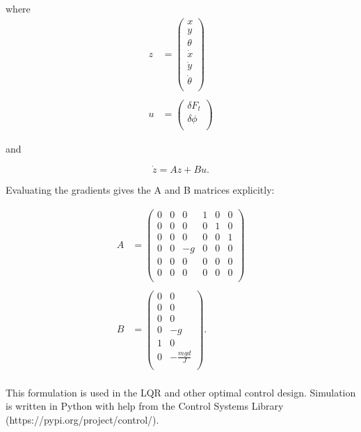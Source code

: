 \documentclass[12pt]{article}
\begin{document}
where 
\begin{align*}
z &= \begin{pmatrix}
x \\
y \\
\theta \\
\dot{x} \\
\dot{y} \\
\dot{\theta} \\
\end{pmatrix} \\ \\
u &= \begin{pmatrix}
\delta F_t \\
\delta\phi \\
\end{pmatrix}
\end{align*}

and

\begin{equation*}
\dot{z} = Az + Bu.
\end{equation*}

Evaluating the gradients gives the A and B matrices explicitly:

\begin{align*}
A &= \begin{pmatrix}
0 & 0 & 0 & 1 & 0 & 0 \\
0 & 0 & 0 & 0 & 1 & 0 \\
0 & 0 & 0 & 0 & 0 & 1 \\
0 & 0 & -g & 0 & 0 & 0 \\
0 & 0 & 0 & 0 & 0 & 0 \\
0 & 0 & 0 & 0 & 0 & 0 \\
\end{pmatrix} \\ \\
B &= \begin{pmatrix}
0 & 0 \\
0 & 0 \\
0 & 0 \\
0 & -g \\
1 & 0 \\
0 & -\frac{mgd}{J} \\
\end{pmatrix}. \\
\end{align*}

\bigskip This formulation is used in the LQR and other optimal control design.  Simulation is written in Python with help from the Control Systems Library (https://pypi.org/project/control/).
\end{document}
